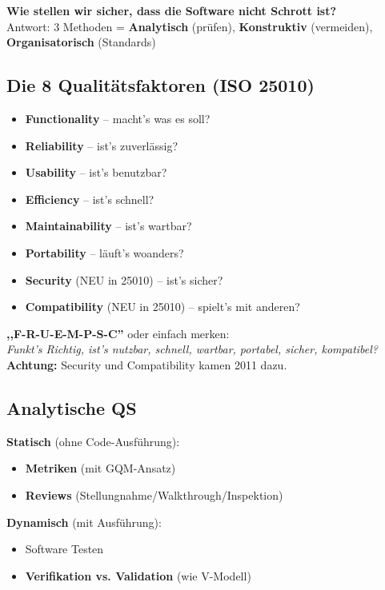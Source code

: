 \documentclass[11pt,a4paper]{article}
\begin{document}
\begin{tldr}
\textbf{Wie stellen wir sicher, dass die Software nicht Schrott ist?}\\
Antwort: 3 Methoden = \textbf{Analytisch} (prüfen), \textbf{Konstruktiv} (vermeiden), \textbf{Organisatorisch} (Standards)
\end{tldr}

\subsection{Die 8 Qualitätsfaktoren (ISO 25010)}

\begin{keyfacts}
\begin{itemize}
  \item \textbf{Functionality} -- macht's was es soll?
  \item \textbf{Reliability} -- ist's zuverlässig?
  \item \textbf{Usability} -- ist's benutzbar?
  \item \textbf{Efficiency} -- ist's schnell?
  \item \textbf{Maintainability} -- ist's wartbar?
  \item \textbf{Portability} -- läuft's woanders?
  \item \textbf{Security} (NEU in 25010) -- ist's sicher?
  \item \textbf{Compatibility} (NEU in 25010) -- spielt's mit anderen?
\end{itemize}
\end{keyfacts}

\begin{merkhilfe}
\textbf{,,F-R-U-E-M-P-S-C''} oder einfach merken:\\
\emph{Funkt's Richtig, ist's nutzbar, schnell, wartbar, portabel, sicher, kompatibel?}\\[4pt]
\textbf{Achtung:} Security und Compatibility kamen 2011 dazu.
\end{merkhilfe}

\subsection{Analytische QS}

\begin{keyfacts}
\textbf{Statisch} (ohne Code-Ausführung):
\begin{itemize}
  \item \textbf{Metriken} (mit GQM-Ansatz)
  \item \textbf{Reviews} (Stellungnahme/Walkthrough/Inspektion)
\end{itemize}

\textbf{Dynamisch} (mit Ausführung):
\begin{itemize}
  \item Software Testen
  \item \textbf{Verifikation vs. Validation} (wie V-Modell)
\end{itemize}
\end{keyfacts}
\end{document}
